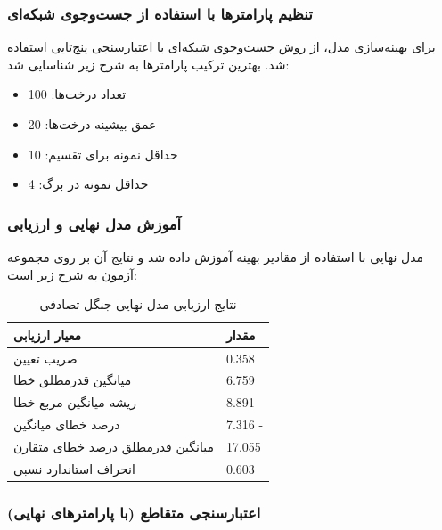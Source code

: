 \subsubsection{تنظیم پارامترها با استفاده از جست‌وجوی شبکه‌ای}

برای بهینه‌سازی مدل، از روش جست‌وجوی شبکه‌ای با اعتبارسنجی پنج‌تایی استفاده شد. بهترین ترکیب پارامترها به شرح زیر شناسایی شد:

\begin{itemize}
	\item تعداد درخت‌ها: \num{100}
	\item عمق بیشینه درخت‌ها: \num{20}
	\item حداقل نمونه برای تقسیم: \num{10}
	\item حداقل نمونه در برگ: \num{4}
\end{itemize}

\subsubsection{آموزش مدل نهایی و ارزیابی}

مدل نهایی با استفاده از مقادیر بهینه آموزش داده شد و نتایج آن بر روی مجموعه آزمون به شرح زیر است:

\begin{table}[H]
	\centering
	\caption{نتایج ارزیابی مدل نهایی جنگل تصادفی}
	\renewcommand{\arraystretch}{1.3}
	\begin{tabular}{>{\centering\arraybackslash}m{4cm} >{\centering\arraybackslash}m{3cm}}
		\toprule
		\textbf{معیار ارزیابی} & \textbf{مقدار} \\
		\midrule
		ضریب تعیین & \num{0.358} \\
		میانگین قدرمطلق خطا & \num{6.759} \\
		ریشه میانگین مربع خطا & \num{8.891} \\
		درصد خطای میانگین & \num{7.316} - \\
		میانگین قدرمطلق درصد خطای متقارن & \num{17.055} \\
		انحراف استاندارد نسبی & \num{0.603} \\
		\bottomrule
	\end{tabular}
	\label{tab:rf_final}
\end{table}

\subsubsection{اعتبارسنجی متقاطع (با پارامترهای نهایی)}

